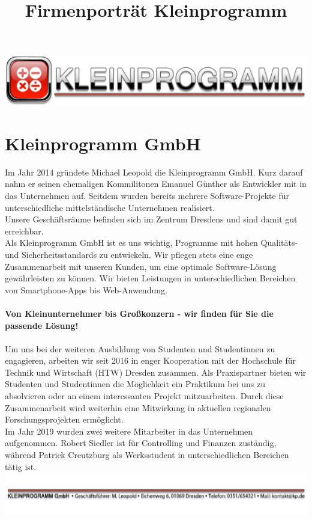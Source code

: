 \documentclass[11pt]{article}
\title{Firmenporträt Kleinprogramm}
\begin{document}
\includegraphics[scale=0.9]{banner.pdf}

\section*{Kleinprogramm GmbH}

Im Jahr 2014 gründete Michael Leopold die Kleinprogramm GmbH. Kurz darauf nahm er seinen ehemaligen Kommilitonen Emanuel Günther als Entwickler mit in das Unternehmen auf. Seitdem wurden bereits mehrere Software-Projekte für unterschiedliche mittelständische Unternehmen realisiert.\\

Unsere Geschäftsräume befinden sich im Zentrum Dresdens und sind damit gut erreichbar.\\
Als Kleinprogramm GmbH ist es uns wichtig, Programme mit hohen Qualitäts- und Sicherheitsstandards zu entwickeln. Wir pflegen stets eine enge Zusammenarbeit mit unseren Kunden, um eine optimale Software-Lösung gewährleisten zu können. Wir bieten Leistungen in unterschiedlichen Bereichen von Smartphone-Apps bis Web-Anwendung. \\ \\

\textbf{Von Kleinunternehmer bis Großkonzern - wir finden für Sie die passende Lösung!} \\ \\

Um uns bei der weiteren Ausbildung von Studenten und Studentinnen zu engagieren,  arbeiten wir seit 2016 in enger Kooperation mit der Hochschule für Technik und Wirtschaft (HTW) Dresden zusammen. Als Praxispartner bieten wir Studenten und Studentinnen die Möglichkeit ein Praktikum bei uns zu absolvieren oder an einem interessanten Projekt mitzuarbeiten. Durch diese Zusammenarbeit wird weiterhin eine Mitwirkung in aktuellen regionalen Forschungs\-projekten ermöglicht. \\

Im Jahr 2019 wurden zwei weitere Mitarbeiter in das Unternehmen aufgenommen. Robert Siedler ist für Controlling und Finanzen zuständig, während Patrick Creutzburg als Werksstudent in unterschiedlichen Bereichen tätig ist.\\

\vspace*{\fill}
\includegraphics[scale=0.9]{footer.pdf}
\thispagestyle{empty}
\end{document}
